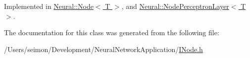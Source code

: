 Implemented in \hyperlink{class_neural_1_1_node_ad812d889cfffc34737a79760cfda3c3a}{Neural::Node$<$ T $>$}, and \hyperlink{class_neural_1_1_node_perceptron_layer_ab469e7b054d75cbe72482b838071800b}{Neural::NodePerceptronLayer$<$ T $>$}.



The documentation for this class was generated from the following file:\begin{DoxyCompactItemize}
\item 
/Users/seimon/Development/NeuralNetworkApplication/\hyperlink{_i_node_8h}{INode.h}\end{DoxyCompactItemize}
